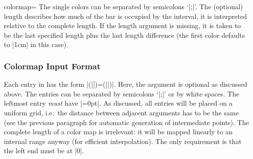 \begin{pgfplotskey}{colormap=}
\noindent The single colors can be separated by semicolons `|;|'. The (optional) length describes how much of the bar is occupied by the interval, it is interpreted relative to the complete length. If the length argument is missing, it is taken to be the last specified length plus the last length difference (the first color defaults to |1cm| in this case). 

\subsubsection{Colormap Input Format}
\label{sec:colormap:input:format}%
Each entry in  has the form |(||)=(||)|. Here, the  argument is optional as discussed above. The entries can be separated by semicolons `|;|' or by white spaces. The leftmost entry \emph{must} have |=0pt|. As discussed, all entries will be placed on a uniform grid, i.e.\ the distance between adjacent  arguments has to be the same (see the previous paragraph for automatic generation of intermediate points). 
The complete length of a color map is irrelevant: it will be mapped linearly to an internal range anyway (for efficient interpolation). The only requirement is that the left end must be at |0|.


\end{pgfplotskey}
